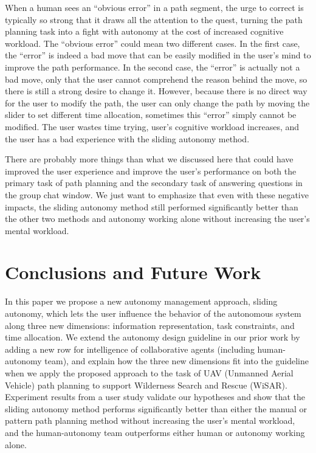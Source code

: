 \documentclass[journal]{IEEEtran}
\begin{document}
When a human sees an ``obvious error'' in a path segment, the urge to correct is typically so strong that it draws all the attention to the quest, turning the path planning task into a fight with autonomy at the cost of increased cognitive workload. The ``obvious error'' could mean two different cases. In the first case, the ``error'' is indeed a bad move that can be easily modified in the user's mind to improve the path performance. In the second case, the ``error'' is actually not a bad move, only that the user cannot comprehend the reason behind the move, so there is still a strong desire to change it. However, because there is no direct way for the user to modify the path, the user can only change the path by moving the slider to set different time allocation, sometimes this ``error'' simply cannot be modified. The user wastes time trying, user's cognitive workload increases, and the user has a bad experience with the sliding autonomy method.

There are probably more things than what we discussed here that could have improved the user experience and improve the user's performance on both the primary task of path planning and the secondary task of answering questions in the group chat window. We just want to emphasize that even with these negative impacts, the sliding autonomy method still performed significantly better than the other two methods and autonomy working alone without increasing the user's mental workload.

\section{Conclusions and Future Work} 
\label{sec:Conclusions6}

In this paper we propose a new autonomy management approach, sliding autonomy, which lets the user influence the behavior of the autonomous system along three new dimensions: information representation, task constraints, and time allocation. We extend the autonomy design guideline in our prior work by adding a new row for intelligence of collaborative agents (including human-autonomy team), and explain how the three new dimensions fit into the guideline when we apply the proposed approach to the task of UAV (Unmanned Aerial Vehicle) path planning to support Wilderness Search and Rescue (WiSAR). Experiment results from a user study validate our hypotheses and show that the sliding autonomy method performs significantly better than either the manual or pattern path planning method without increasing the user's mental workload, and the human-autonomy team outperforms either human or autonomy working alone.
\end{document}
